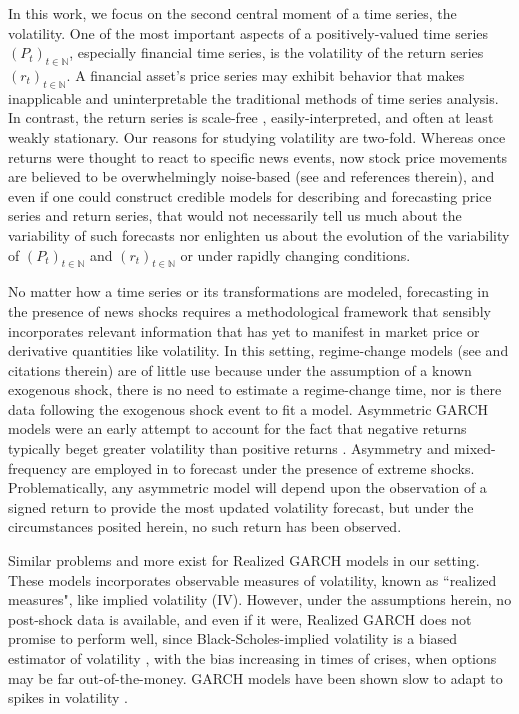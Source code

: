 \documentclass{uiucthesis2021}
\theoremstyle{definition}
\begin{document}
In this work, we focus on the second central moment of a time series, the volatility.  One of the most important aspects of a positively-valued time series $(P_{t})_{t\in\mathbb{N}}$, especially financial time series, is the volatility of the return series $(r_{t})_{t\in\mathbb{N}}$.  A financial asset's price series may exhibit behavior that makes inapplicable and uninterpretable the traditional methods of time series analysis.  In contrast, the return series is scale-free \parencite[][]{tsay2005analysis}, easily-interpreted, and often at least weakly stationary.  Our reasons for studying volatility are two-fold.  Whereas once returns were thought to react to specific news events, now stock price movements are believed to be overwhelmingly noise-based (see \cite[][]{boudoukh2019information} and references therein), and even if one could construct credible models for describing and forecasting price series and return series, that would not necessarily tell us much about the variability of such forecasts nor enlighten us about the evolution of the variability of $(P_{t})_{t\in\mathbb{N}}$ and $(r_{t})_{t\in\mathbb{N}}$ or under rapidly changing conditions. 

No matter how a time series or its transformations are modeled, forecasting in the presence of news shocks requires a methodological framework that sensibly incorporates relevant information that has yet to manifest in market price or derivative quantities like volatility.  In this setting, regime-change models (see \parencite[][]{bauwens2006regime} and citations therein) are of little use because under the assumption of a known exogenous shock, there is no need to estimate a regime-change time, nor is there data following the exogenous shock event to fit a model.  Asymmetric GARCH models were an early attempt to account for the fact that negative returns typically beget greater volatility than positive returns \parencite{hansen2012realized}.  Asymmetry and mixed-frequency are employed in \cite[][]{wang2020forecasting} to forecast under the presence of extreme shocks.  Problematically, any asymmetric model will depend upon the observation of a signed return to provide the most updated volatility forecast, but under the circumstances posited herein, no such return has been observed.

Similar problems and more exist for Realized GARCH models \parencite[][]{hansen2012realized} in our setting. These models incorporates observable measures of volatility, known as  ``realized measures", like implied volatility (IV). However, under the assumptions herein, no post-shock data is available, and even if it were, Realized GARCH does not promise to perform well, since Black-Scholes-implied volatility is a biased estimator of volatility \parencite[][]{mayhew1995implied, christensen1998relation}, with the bias increasing in times of crises, when options may be far out-of-the-money.  GARCH models have been shown slow to adapt to spikes in volatility \parencite[][]{andersen2003modeling}.
\end{document}
